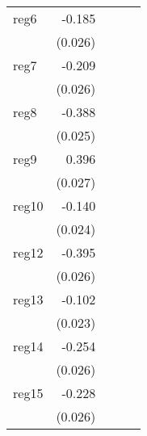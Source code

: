 {\begin{longtable}{l*{4}{D{.}{.}{-1}}}
\addlinespace
reg6        &      -0.185\sym{***}&                     &                     &                     \\
            &     (0.026)         &                     &                     &                     \\
\addlinespace
reg7        &      -0.209\sym{***}&                     &                     &                     \\
            &     (0.026)         &                     &                     &                     \\
\addlinespace
reg8        &      -0.388\sym{***}&                     &                     &                     \\
            &     (0.025)         &                     &                     &                     \\
\addlinespace
reg9        &       0.396\sym{***}&                     &                     &                     \\
            &     (0.027)         &                     &                     &                     \\
\addlinespace
reg10       &      -0.140\sym{***}&                     &                     &                     \\
            &     (0.024)         &                     &                     &                     \\
\addlinespace
reg12       &      -0.395\sym{***}&                     &                     &                     \\
            &     (0.026)         &                     &                     &                     \\
\addlinespace
reg13       &      -0.102\sym{***}&                     &                     &                     \\
            &     (0.023)         &                     &                     &                     \\
\addlinespace
reg14       &      -0.254\sym{***}&                     &                     &                     \\
            &     (0.026)         &                     &                     &                     \\
\addlinespace
reg15       &      -0.228\sym{***}&                     &                     &                     \\
            &     (0.026)         &                     &                     &                     \\

\end{longtable}}
